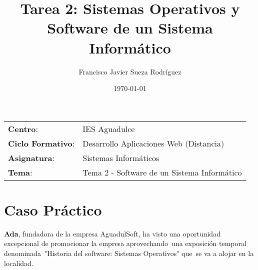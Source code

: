 


\title{
\vspace{10ex}
\normalfont \normalsize
\Huge \textbf{Tarea 2: Sistemas Operativos y Software de un Sistema Informático}
}
\author{Francisco Javier Sueza Rodríguez}
\date{\normalsize\today}



\maketitle

\thispagestyle{empty}

\vspace{68ex}

\begin{center}
    \begin{tabular}{l l}
        \textbf{Centro}: & IES Aguadulce \\
        \textbf{Ciclo Formativo}: & Desarrollo Aplicaciones Web (Distancia)\\
        \textbf{Asignatura}: & Sistemas Informáticos\\
        \textbf{Tema}: & Tema 2 -  Software de un Sistema Informático\\
    \end{tabular}
\end{center}

\newpage

\tableofcontents

\vspace{15ex}




\newpage

\section{Caso Práctico}
\textbf{Ada}, fundadora de la empresa AguadulSoft, ha visto una oportunidad excepcional de promocionar la empresa aprovechando una exposición temporal denominada "Historia del software: Sistemas Operativos" que se va a alojar en la localidad.

